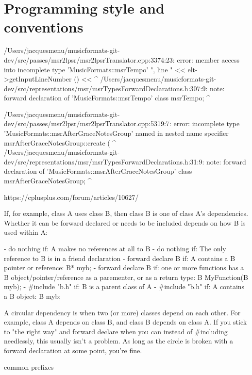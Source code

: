 
\chapter{Programming style and conventions}
/Users/jacquesmenu/musicformats-git-dev/src/passes/msr2lpsr/msr2lpsrTranslator.cpp:3374:23: error: member access into incomplete type 'MusicFormats::msrTempo'
      ", line " << elt->getInputLineNumber () <<
                      ^
/Users/jacquesmenu/musicformats-git-dev/src/representations/msr/msrTypesForwardDeclarations.h:307:9: note: forward declaration of 'MusicFormats::msrTempo'
class   msrTempo;
        ^


/Users/jacquesmenu/musicformats-git-dev/src/passes/msr2lpsr/msr2lpsrTranslator.cpp:5319:7: error: incomplete type 'MusicFormats::msrAfterGraceNotesGroup' named in nested name specifier
      msrAfterGraceNotesGroup::create (
      ^~~~~~~~~~~~~~~~~~~~~~~~~
/Users/jacquesmenu/musicformats-git-dev/src/representations/msr/msrTypesForwardDeclarations.h:31:9: note: forward declaration of 'MusicFormats::msrAfterGraceNotesGroup'
class   msrAfterGraceNotesGroup;
        ^


https://cplusplus.com/forum/articles/10627/

If, for example, class A uses class B, then class B is one of class A's dependencies. Whether it can be forward declared or needs to be included depends on how B is used within A:


- do nothing if: A makes no references at all to B
- do nothing if: The only reference to B is in a friend declaration
- forward declare B if: A contains a B pointer or reference: B* myb;
- forward declare B if: one or more functions has a B object/pointer/reference
as a parementer, or as a return type: B MyFunction(B myb);
- #include "b.h" if: B is a parent class of A
- #include "b.h" if: A contains a B object: B myb;

A circular dependency is when two (or more) classes depend on each other. For example, class A depends on class B, and class B depends on class A. If you stick to "the right way" and forward declare when you can instead of #including needlessly, this usually isn't a problem. As long as the circle is broken with a forward declaration at some point, you're fine.

common prefixes


